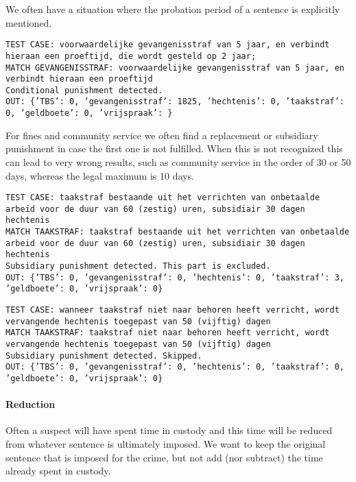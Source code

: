 \documentclass[a4paper]{article}
\begin{document}
We often have a situation where the probation period of a sentence is explicitly mentioned.

\texttt{TEST CASE: %
voorwaardelijke gevangenisstraf van 5 jaar, en verbindt hieraan een proeftijd, die wordt gesteld op 2 jaar;\\
MATCH GEVANGENISSTRAF: voorwaardelijke gevangenisstraf van 5 jaar, en verbindt hieraan een proeftijd\\
Conditional punishment detected.\\
OUT: \{'TBS': 0, 'gevangenisstraf': 1825, 'hechtenis': 0, 'taakstraf': 0, 'geldboete': 0, 'vrijspraak': \}}

For fines and community service we often find a replacement or subsidiary punishment in case the first one is not fulfilled.
When this is not recognized this can lead to very wrong results, such as community service in the order of 30 or 50 days, whereas the legal maximum is 10 days.

\texttt{TEST CASE: %
taakstraf bestaande uit het verrichten van onbetaalde arbeid voor de duur van 60 (zestig) uren, subsidiair 30 dagen hechtenis\\
MATCH TAAKSTRAF: taakstraf bestaande uit het verrichten van onbetaalde arbeid voor de duur van 60 (zestig) uren, subsidiair 30 dagen hechtenis\\
Subsidiary punishment detected. This part is excluded.\\
OUT: \{'TBS': 0, 'gevangenisstraf': 0, 'hechtenis': 0, 'taakstraf': 3, 'geldboete': 0, 'vrijspraak': 0\}}

\texttt{TEST CASE: %
wanneer taakstraf niet naar behoren heeft verricht, wordt vervangende hechtenis toegepast van 50 (vijftig) dagen\\
MATCH TAAKSTRAF: taakstraf niet naar behoren heeft verricht, wordt vervangende hechtenis toegepast van 50 (vijftig) dagen\\
Subsidiary punishment detected. Skipped.\\
OUT: \{'TBS': 0, 'gevangenisstraf': 0, 'hechtenis': 0, 'taakstraf': 0, 'geldboete': 0, 'vrijspraak': 0\}}

\paragraph{Reduction}

Often a suspect will have spent time in custody and this time will be reduced from whatever sentence is ultimately imposed.
We want to keep the original sentence that is imposed for the crime, but not add (nor subtract) the time already spent in custody.
\end{document}
